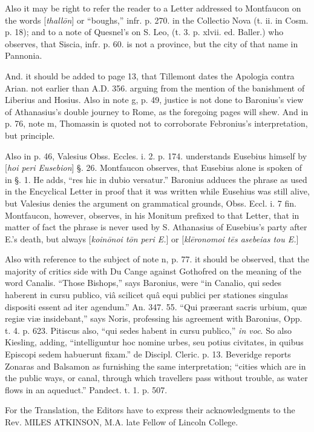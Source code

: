 Also it may be right to refer
the reader to a Letter addressed to Montfaucon on the words [\emph{thall\={o}n}]
or “boughs,” infr. p. 270. in the Collectio Nova (t. ii. in Cosm.
p. 18); and to a note of Quesnel's on S. Leo, (t. 3. p. xlvii. ed.
Baller.) who observes, that Siscia, infr. p. 60. is not a province,
but the city of that name in Pannonia.

And. it should be added to
page 13, that Tillemont dates the Apologia contra Arian. not earlier
than A.D.
356. arguing from the mention of the banishment of Liberius and Hosius.
Also in note g, p. 49, justice is not done to Baronius's view of
Athanasius's double journey to Rome, as the foregoing pages will shew.
And in p. 76, note m, Thomassin is quoted not to corroborate Febronius's
interpretation, but principle.

Also in p. 46, Valesius Obss.
Eccles. i. 2. p. 174. understands Eusebius himself by [\emph{hoi peri
Eusebion}] §. 26. Montfaucon observes, that Eusebius alone is
spoken of in §. 1. He adds, “res hic in dubio versatur.” Baronius
adduces the phrase as used in the Encyclical Letter in proof that it
was written while Eusehius was still alive, but Valesius denies the
argument on grammatical grounds, Obss. Eccl. i. 7 fin. Montfaucon,
however, observes, in his Monitum prefixed to that Letter, that in
matter of fact the phrase is never used by S. Athanasius of
Eusebius's party after E.'s death, but always [\emph{koin\={o}noi t\={o}n
peri E.}] or [\emph{kl\={e}ronomoi t\={e}s asebeias tou E.}]

Also with reference to the
subject of note n, p. 77. it should be observed, that the majority of
critics side with Du Cange against Gothofred on the meaning of the
word Canalis. “Those Bishops,” says Baronius, were “in Canalio,
qui sedes haberent in cursu publico, viâ scilicet quâ equi publici
per stationes singulas dispositi essent ad iter agendum.” An. 347.
55. “Qui præerant sacris urbium, quæ regiæ viæ insidebant,”
says Noris, professing his agreement with Baronius, Opp. t. 4. p. 623.
Pitiscus also, “qui sedes habent in cursu publico,” \emph{in voc}.
So also Kiesling, adding, “intelliguntur hoc nomine urbes, seu
potius civitates, in quibus Episcopi sedem habuerunt fixam.” de
Discipl. Cleric. p. 13. Beveridge reports Zonaras and Balsamon as
furnishing the same interpretation; “cities which are in the public
ways, or canal, through which travellers pass without trouble, as
water flows in an aqueduct.” Pandect. t. 1. p. 507.

For the Translation, the
Editors have to express their acknowledgments to the Rev. MILES
ATKINSON,
M.A. late Fellow of Lincoln College.


